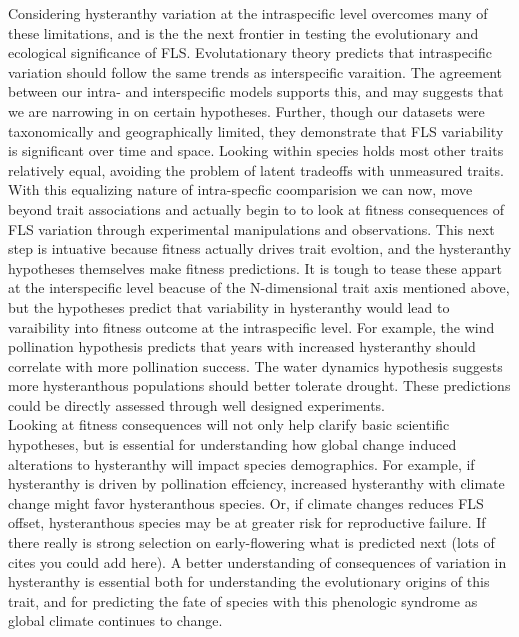 \documentclass[12pt]{article}\usepackage[]{graphicx}\usepackage[]{color}
\begin{document}
{\indent Considering hysteranthy variation at the intraspecific level overcomes many of these limitations, and is the the next frontier in testing the evolutionary and ecological significance of FLS. Evolutationary theory predicts that intraspecific variation should follow the same trends as interspecific varaition. The agreement between our intra- and interspecific models supports this, and may suggests that we are narrowing in on certain hypotheses. Further, though our datasets were taxonomically and geographically limited, they demonstrate that FLS variability is significant over time and space. Looking within species holds most other traits relatively equal, avoiding the problem of latent tradeoffs with unmeasured traits.\\
\indent With this equalizing nature of intra-specfic coomparision we can now, move beyond trait associations and actually begin to to look at fitness consequences of FLS variation through experimental manipulations and observations. This next step is intuative because fitness actually drives trait evoltion, and the hysteranthy hypotheses themselves make fitness predictions. It is tough to tease these appart at the interspecific level beacuse of the N-dimensional trait axis mentioned above, but the hypotheses predict that variability in hysteranthy would lead to varaibility into fitness outcome at the intraspecific level. For example, the wind pollination hypothesis predicts that years with increased hysteranthy should correlate with more pollination success. The water dynamics hypothesis suggests more hysteranthous populations should better tolerate drought. These predictions could be directly assessed through well designed experiments.\\
\indent Looking at fitness consequences will not only help clarify basic scientific hypotheses, but is essential for understanding how global change induced alterations to hysteranthy will impact species demographics. For example, if hysteranthy is driven by pollination effciency, increased hysteranthy with climate change might favor hysteranthous species. Or, if climate changes reduces FLS offset, hysteranthous species may be at greater risk for reproductive failure. If there really is strong selection on early-flowering what is predicted next (lots of cites you could add here). %
A better understanding of consequences of variation in hysteranthy is essential both for understanding the evolutionary origins of this trait, and for predicting the fate of species with this phenologic syndrome as global climate continues to change.

}
\end{document}
